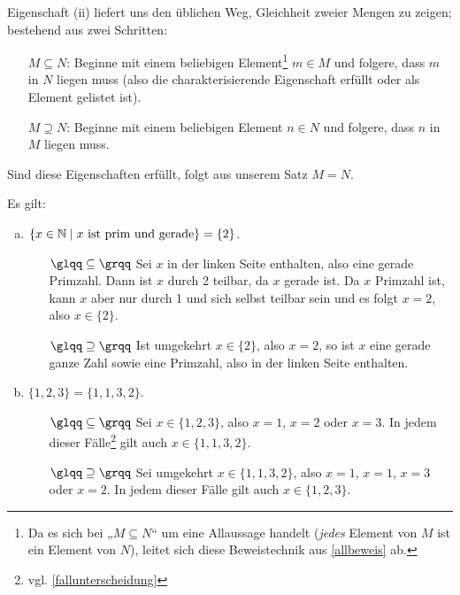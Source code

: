 \begin{bem}
	Eigenschaft (ii) liefert uns den üblichen Weg, Gleichheit zweier Mengen zu zeigen; bestehend aus zwei Schritten:
		\begin{enumerate}
			\item[$M\subseteq N$:] Beginne mit einem beliebigen Element\footnote{Da es sich bei „$M\subseteq N$“ um eine Allaussage handelt (\emph{jedes} Element von $M$ ist ein Element von $N$), leitet sich diese Beweistechnik aus \cref{allbeweis} ab.} $m\in M$ und folgere, dass $m$ in $N$ liegen muss (also die charakterisierende Eigenschaft erfüllt oder als Element gelistet ist).
			\item[$M\supseteq N$:] Beginne mit einem beliebigen Element $n\in N$ und folgere, dass $n$ in $M$ liegen muss.
		\end{enumerate}
	Sind diese Eigenschaften erfüllt, folgt aus unserem Satz $M=N$.
\end{bem}

\begin{bsp}\label{bsp:mengengleichheiten} Es gilt:
	\begin{enumerate}[a)]
		\item $\{x\in{\mathbb N}\mid x\text{ ist prim und gerade}\}=\{2\}$.
\begin{bew}
		\begin{itemize}			
		\item[$\glqq\subseteq\grqq$] Sei $x$ in der linken Seite enthalten, also eine gerade Primzahl. Dann ist $x$ durch 2 teilbar, da $x$ gerade ist. Da $x$ Primzahl ist, kann $x$ aber nur durch 1 und sich selbst teilbar sein und es folgt $x=2$, also $x\in\{2\}$.
		\item[$\glqq\supseteq\grqq$] Ist umgekehrt $x\in\{2\}$, also $x=2$, so ist $x$ eine gerade ganze Zahl sowie eine Primzahl, also in der linken Seite enthalten.		
		\end{itemize}
\end{bew}
		\item $\{1,2,3\}=\{1,1,3,2\}$.
\begin{bew}
		\begin{itemize}			
			\item[$\glqq\subseteq\grqq$] Sei $x\in\{1,2,3\}$, also $x=1$, $x=2$ oder $x=3$. In jedem dieser Fälle\footnote{vgl. \cref{fallunterscheidung}} gilt auch $x\in\{1,1,3,2\}$.
			\item[$\glqq\supseteq\grqq$] Sei umgekehrt $x\in\{1,1,3,2\}$,  also $x=1$, $x=1$, $x=3$ oder $x=2$. In jedem dieser Fälle gilt auch $x\in\{1,2,3\}$.
		\end{itemize}
\end{bew}
	\end{enumerate}
\end{bsp}


